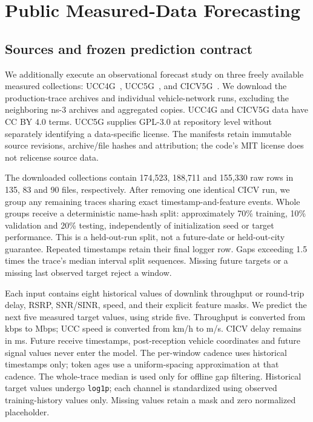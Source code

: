 \section{Public Measured-Data Forecasting}
\label{sec:public}
\subsection{Sources and frozen prediction contract}
We additionally execute an observational forecast study on three freely
available measured collections: UCC4G~\cite{ucc4g}, UCC5G~\cite{ucc5g}, and
CICV5G~\cite{cicv5g}. We download the production-trace archives and individual
vehicle-network runs, excluding the neighboring ns-3 archives and aggregated
copies. UCC4G and CICV5G data have CC BY 4.0 terms. UCC5G supplies GPL-3.0 at
repository level without separately identifying a data-specific license.
The manifests retain immutable source revisions, archive/file hashes and
attribution; the code's MIT license does not relicense source data.

The downloaded collections contain 174,523, 188,711 and 155,330 raw rows in
135, 83 and 90 files, respectively. After removing one identical CICV run,
we group any remaining traces sharing exact timestamp-and-feature events.
Whole groups receive a deterministic name-hash split: approximately 70\%
training, 10\% validation and 20\% testing, independently of initialization
seed or target performance. This is a held-out-run split, not a future-date
or held-out-city guarantee. Repeated timestamps retain their final logger
row. Gaps exceeding 1.5 times the trace's median interval split sequences.
Missing future targets or a missing last observed target reject a window.

Each input contains eight historical values of downlink throughput or
round-trip delay, RSRP, SNR/SINR, speed, and their explicit feature masks.
We predict the next five measured target values, using stride five.
Throughput is converted from kbps to Mbps; UCC speed is converted from km/h
to m/s. CICV delay remains in ms. Future receive timestamps, post-reception
vehicle coordinates and future signal values never enter the model.
The per-window cadence uses historical timestamps only; token ages use a
uniform-spacing approximation at that cadence. The whole-trace median is
used only for offline gap filtering. Historical target values undergo
\texttt{log1p}; each channel is standardized using observed training-history
values only. Missing values retain a mask and zero normalized placeholder.

